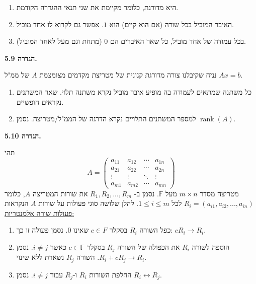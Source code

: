 \documentclass[12pt]{report}
\theoremstyle{plain}
\theoremstyle{definition}
\newcommand{\F}{\mathbb{F}}
\DeclareMathOperator{\rank}{rank}
\newcommand{\0}{\mathbf{0}}
\begin{document}
\begin{enumerate}[label=\alph*.]
\item
היא מדורגת, כלומר מקיימת את שני תנאי ההגדרה הקודמת.

\item
האיבר המוביל בכל שורה (אם הוא קיים) הוא
$1$.
אפשר גם לקרוא לו אחד מוביל.

\item
בכל עמודה של אחד מוביל, כל שאר האיברים הם $0$ (מתחת וגם מעל לאחד המוביל).
\end{enumerate}
\bigskip
\bigskip

\noindent\textbf{הגדרה 5.9.}

נניח שקיבלנו צורה מדורגת קנונית של מטריצת מקדמים מצומצמת
$A$
של ממ"ל $Ax=b$.

\begin{enumerate}[label=\alph*.]
\item
כל משתנה שמתאים לעמודה בה מופיע איבר מוביל נקרא משתנה תלוי. שאר
המשתנים נקראים חופשיים.

\item
למספר המשתנים התלויים נקרא הדרגה של הממ"ל/מטריצה.
נסמן $\rank(A)$.
\end{enumerate}
\bigskip
\bigskip

\noindent\textbf{הגדרה 5.10.}

תהי
$$
A=\begin{pmatrix}a_{11} & a_{12} & \cdots & a_{1n}\\
a_{21} & a_{22} & \cdots & a_{2n}\\
\vdots & \vdots & \ddots & \vdots\\
a_{m1} & a_{m2} & \cdots & a_{mn}
\end{pmatrix}
$$
מטריצה מסדר
$m\times n$
מעל $\F$.
נסמן ב-
$R_1,R_2,...,R_m$
את שורות המטריצה
$A$,
כלומר
$R_{i}=(a_{i1},a_{i2},...,a_{in})$
לכל
$1\leq i\leq m$.
להלן שלושה סוגי פעולות על שורות
$A$ הנקראות
\underline{פעולות שורה
אלמנטריות:}

\begin{enumerate}[label=\alph*.]
\item
 כפל השורה
 $R_{i}$
 בסקלר
 $c\in F$
 שאינו
$0$.
נסמן פעולה זו כך:
$cR_{i}\rightarrow R_{i}$.

\item
 הוספה לשורה
 $R_{i}$
 את הכפולה של השורה $R_{j}$
בסקלר
$c\in \F$
כאשר $i\neq j$.
נסמן $R_{i}+cR_{j}\rightarrow R_{i}$.
השורה
$R_{j}$
נשארת ללא שינוי.

\item
החלפת השורות $R_{i}$ ו-$R_{j}$ עבור $i\neq j$.
נסמן $R_{i}\leftrightarrow R_{j}$.
\end{enumerate}
\bigskip
\bigskip
\end{document}
